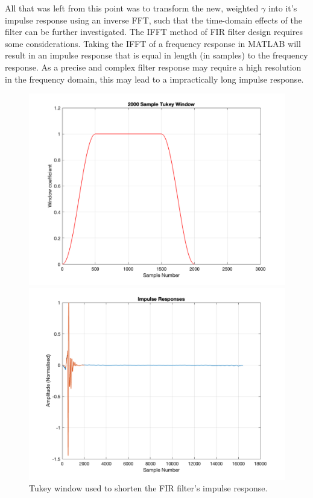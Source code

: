 \documentclass{report}
\begin{document}
            All that was left from this point was to transform the new, weighted $\gamma$ into it's impulse response using an inverse FFT, such that the time-domain effects of the filter can be further investigated.
            The IFFT method of FIR filter design requires some considerations.
            Taking the IFFT of a frequency response in MATLAB will result in an impulse response that is equal in length (in samples) to the frequency response.
            As a precise and complex filter response may require a high resolution in the frequency domain, this may lead to a impractically long impulse response.

            \begin{figure}[H]
                \centering
                \begin{minipage}{.49\textwidth}
                    \includegraphics[width=\linewidth]{figs/tukeyWin.png}
                    \caption{Tukey window used to shorten the FIR filter's impulse response.}
                    \label{tukeyWin}
                \end{minipage}
                \begin{minipage}{.49\textwidth}
                    \includegraphics[width=\linewidth]{figs/tukeyImpulse.png}

\end{minipage}
\end{figure}
\end{document}
